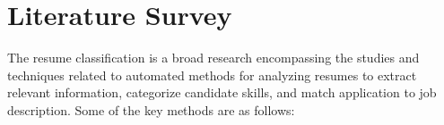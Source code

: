 \chapter{Literature Survey}

The resume classification is a broad research encompassing the studies and techniques related to automated methods for analyzing resumes to extract relevant information, categorize candidate skills, and match application to job description. Some of the key methods are as follows:


